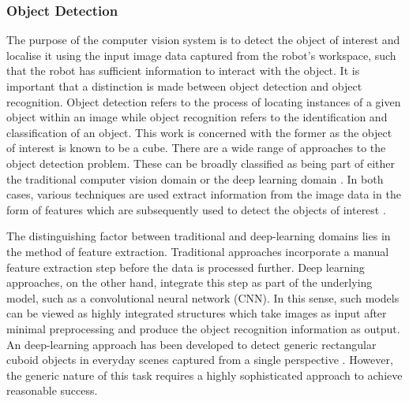 



\subsubsection{Object Detection}


The purpose of the computer vision system is to detect the object of interest and localise it using the input image data captured from the robot's workspace, such that the robot has sufficient information to interact with the object. It is important that a distinction is made between object detection and object recognition. Object detection refers to the process of locating instances of a given object within an image while object recognition refers to the identification and classification of an object. This work is concerned with the former as the object of interest is known to be a cube. There are a wide range of approaches to the object detection problem. These can be broadly classified as being part of either the traditional computer vision domain or the deep learning domain \cite{MathWorks:Object_Recognition}. In both cases, various techniques are used extract information from the image data in the form of features which are subsequently used to detect the objects of interest \cite{Kumar:Visual_Servoing}. 

The distinguishing factor between traditional and deep-learning domains lies in the method of feature extraction. Traditional approaches incorporate a manual feature extraction step before the data is processed further. Deep learning approaches, on the other hand, integrate this step as part of the underlying model, such as a convolutional neural network (CNN). In this sense, such models can be viewed as highly integrated structures which take images as input after minimal preprocessing and produce the object recognition information as output. An deep-learning approach has been developed to detect generic rectangular cuboid objects in everyday scenes captured from a single perspective \cite{Xiao:Localizing_3D_Cuboids}. However, the generic nature of this task requires a highly sophisticated approach to achieve reasonable success. 


